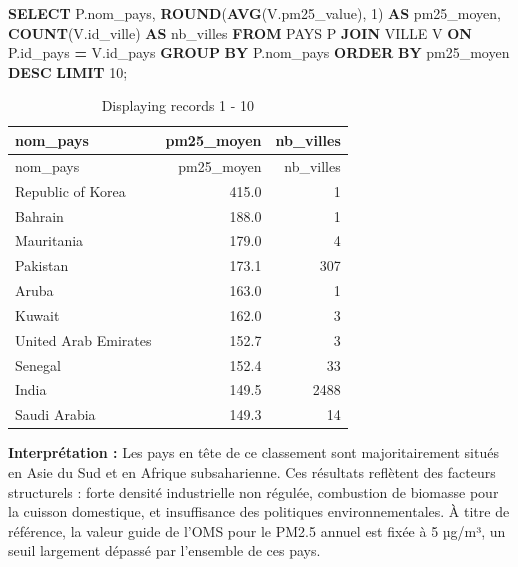 \documentclass[mstat,12pt]{unswthesis}
\newenvironment{Shaded}{\begin{snugshade}}{\end{snugshade}}
\newcommand{\DecValTok}[1]{\textcolor[rgb]{0.00,0.00,0.81}{#1}}
\newcommand{\FunctionTok}[1]{\textcolor[rgb]{0.13,0.29,0.53}{\textbf{#1}}}
\newcommand{\KeywordTok}[1]{\textcolor[rgb]{0.13,0.29,0.53}{\textbf{#1}}}
\newcommand{\NormalTok}[1]{#1}
\newcommand{\OperatorTok}[1]{\textcolor[rgb]{0.81,0.36,0.00}{\textbf{#1}}}
\begin{document}
\begin{Shaded}
\begin{Highlighting}[]
\KeywordTok{SELECT}\NormalTok{ P.nom\_pays,}
       \FunctionTok{ROUND}\NormalTok{(}\FunctionTok{AVG}\NormalTok{(V.pm25\_value), }\DecValTok{1}\NormalTok{) }\KeywordTok{AS}\NormalTok{ pm25\_moyen,}
       \FunctionTok{COUNT}\NormalTok{(V.id\_ville)           }\KeywordTok{AS}\NormalTok{ nb\_villes}
\KeywordTok{FROM}\NormalTok{ PAYS  P}
\KeywordTok{JOIN}\NormalTok{ VILLE V }\KeywordTok{ON}\NormalTok{ P.id\_pays }\OperatorTok{=}\NormalTok{ V.id\_pays}
\KeywordTok{GROUP} \KeywordTok{BY}\NormalTok{ P.nom\_pays}
\KeywordTok{ORDER} \KeywordTok{BY}\NormalTok{ pm25\_moyen }\KeywordTok{DESC}
\KeywordTok{LIMIT} \DecValTok{10}\NormalTok{;}
\end{Highlighting}
\end{Shaded}

\begin{longtable}[]{@{}lrr@{}}
\caption{Displaying records 1 - 10}\tabularnewline
\toprule\noalign{}
nom\_pays & pm25\_moyen & nb\_villes \\
\midrule\noalign{}
\endfirsthead
\toprule\noalign{}
nom\_pays & pm25\_moyen & nb\_villes \\
\midrule\noalign{}
\endhead
\bottomrule\noalign{}
\endlastfoot
Republic of Korea & 415.0 & 1 \\
Bahrain & 188.0 & 1 \\
Mauritania & 179.0 & 4 \\
Pakistan & 173.1 & 307 \\
Aruba & 163.0 & 1 \\
Kuwait & 162.0 & 3 \\
United Arab Emirates & 152.7 & 3 \\
Senegal & 152.4 & 33 \\
India & 149.5 & 2488 \\
Saudi Arabia & 149.3 & 14 \\
\end{longtable}

\textbf{Interprétation :} Les pays en tête de ce classement sont
majoritairement situés en Asie du Sud et en Afrique subsaharienne. Ces
résultats reflètent des facteurs structurels : forte densité
industrielle non régulée, combustion de biomasse pour la cuisson
domestique, et insuffisance des politiques environnementales. À titre de
référence, la valeur guide de l'OMS pour le PM2.5 annuel est fixée à 5
µg/m³, un seuil largement dépassé par l'ensemble de ces pays.

\medskip
\end{document}
